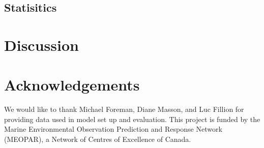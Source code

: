 \documentclass[pdftex,10pt]{article}
\begin{document}
\subsection{Statisitics}

\section{Discussion}\label{sec:diss}

\section{Acknowledgements}\label{sec:ack}
We would like to thank Michael Foreman, Diane Masson, and Luc Fillion for providing data used in model set up and evaluation. This project is funded by the Marine Environmental Observation Prediction and Response Network (MEOPAR), a Network of Centres of Excellence of Canada.  



\end{document}
